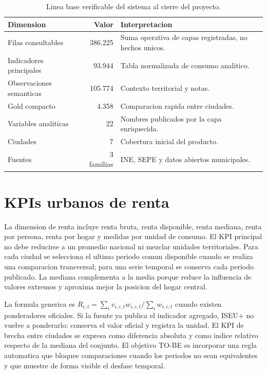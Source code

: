 \begin{table}[H]
\centering
\caption{Linea base verificable del sistema al cierre del proyecto.}
\label{tab:linea-base}
\begin{tabularx}{\textwidth}{XrX}
\toprule
\textbf{Dimension} & \textbf{Valor} & \textbf{Interpretacion} \\
\midrule
Filas consultables & 386.225 & Suma operativa de capas registradas, no hechos unicos. \\
Indicadores principales & 93.944 & Tabla normalizada de consumo analitico. \\
Observaciones semanticas & 105.774 & Contexto territorial y notas. \\
Gold compacto & 4.358 & Comparacion rapida entre ciudades. \\
Variables analiticas & 22 & Nombres publicados por la capa enriquecida. \\
Ciudades & 7 & Cobertura inicial del producto. \\
Fuentes & 3 familias & INE, SEPE y datos abiertos municipales. \\
\bottomrule
\end{tabularx}
\end{table}

\section{KPIs urbanos de renta}

La dimension de renta incluye renta bruta, renta disponible, renta mediana, renta por persona, renta por hogar y medidas por unidad de consumo. El KPI principal no debe reducirse a un promedio nacional ni mezclar unidades territoriales. Para cada ciudad se selecciona el ultimo periodo comun disponible cuando se realiza una comparacion transversal; para una serie temporal se conserva cada periodo publicado. La mediana complementa a la media porque reduce la influencia de valores extremos y aproxima mejor la posicion del hogar central.

La formula generica es $R_{c,t}=\sum_i v_{i,c,t}w_{i,c,t}/\sum_i w_{i,c,t}$ cuando existen ponderadores oficiales. Si la fuente ya publica el indicador agregado, ISEU+ no vuelve a ponderarlo: conserva el valor oficial y registra la unidad. El KPI de brecha entre ciudades se expresa como diferencia absoluta y como indice relativo respecto de la mediana del conjunto. El objetivo TO-BE es incorporar una regla automatica que bloquee comparaciones cuando los periodos no sean equivalentes y que muestre de forma visible el desfase temporal.

